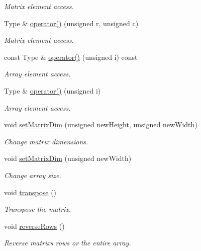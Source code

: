 \begin{DoxyCompactItemize}
\begin{DoxyCompactList}\small\item\em Matrix element access. \end{DoxyCompactList}\item 
Type \& \hyperlink{classMatrix2D_a448fd38c905dd2879244ac345c76b14e}{operator()} (unsigned r, unsigned c)
\begin{DoxyCompactList}\small\item\em Matrix element access. \end{DoxyCompactList}\item 
const Type \& \hyperlink{classMatrix2D_ac5b60589d9d867150e045887aaebe5b0}{operator()} (unsigned i) const
\begin{DoxyCompactList}\small\item\em Array element access. \end{DoxyCompactList}\item 
Type \& \hyperlink{classMatrix2D_afebec0a3fc73a157fe8044416fb6d0b3}{operator()} (unsigned i)
\begin{DoxyCompactList}\small\item\em Array element access. \end{DoxyCompactList}\item 
void \hyperlink{classMatrix2D_abf7025332a5f4f75b172fb1a3ad56176}{set\+Matrix\+Dim} (unsigned new\+Height, unsigned new\+Width)
\begin{DoxyCompactList}\small\item\em Change matrix dimensions. \end{DoxyCompactList}\item 
void \hyperlink{classMatrix2D_a02d8df2be95d08423b44009ffe01c12f}{set\+Matrix\+Dim} (unsigned new\+Width)
\begin{DoxyCompactList}\small\item\em Change array size. \end{DoxyCompactList}\item 
void \hyperlink{classMatrix2D_a788abe5e1fbd6a1fbd0d445aca4f8300}{transpose} ()
\begin{DoxyCompactList}\small\item\em Transpose the matrix. \end{DoxyCompactList}\item 
void \hyperlink{classMatrix2D_aaaefe293f1a0549afb2e506b71b18490}{reverse\+Rows} ()
\begin{DoxyCompactList}\small\item\em Reverse matrix\textquotesingle{}s rows or the entire array. \end{DoxyCompactList}\item 

\end{DoxyCompactItemize}
